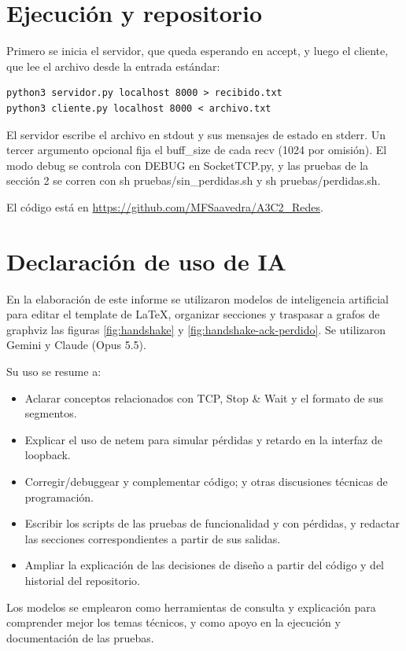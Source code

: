 \documentclass[
	spanish, %
	letterpaper, oneside
]{article}
\newcommand{\code}[1]{#1}     %
\newcommand{\field}[1]{#1}    %
\begin{document}
\section{Ejecución y repositorio}
Primero se inicia el servidor, que queda esperando en \code{accept}, y luego el cliente, que lee
el archivo desde la entrada estándar:

\begin{verbatim}
python3 servidor.py localhost 8000 > recibido.txt
python3 cliente.py localhost 8000 < archivo.txt
\end{verbatim}

El servidor escribe el archivo en stdout y sus mensajes de estado en stderr. Un tercer argumento
opcional fija el \field{buff\_size} de cada \code{recv} (1024 por omisión). El modo debug se
controla con \code{DEBUG} en \code{SocketTCP.py}, y las pruebas de la sección 2 se corren con
\code{sh pruebas/sin\_perdidas.sh} y \code{sh pruebas/perdidas.sh}.

El código está en \url{https://github.com/MFSaavedra/A3C2_Redes}.

\section{Declaración de uso de IA}
En la elaboración de este informe se utilizaron modelos de inteligencia artificial para editar el template de LaTeX, organizar secciones y traspasar a grafos de graphviz las figuras \ref{fig:handshake} y \ref{fig:handshake-ack-perdido}. Se utilizaron Gemini y Claude (Opus 5.5).

Su uso se resume a:
\begin{itemize}
	\item Aclarar conceptos relacionados con TCP, Stop \& Wait y el formato de sus segmentos.
	\item Explicar el uso de netem para simular pérdidas y retardo en la interfaz de loopback.
	\item Corregir/debuggear y complementar código; y otras discusiones técnicas de programación.
	\item Escribir los scripts de las pruebas de funcionalidad y con pérdidas, y redactar las secciones correspondientes a partir de sus salidas.
	\item Ampliar la explicación de las decisiones de diseño a partir del código y del historial del repositorio.
\end{itemize}

Los modelos se emplearon como herramientas de consulta y explicación para comprender mejor los temas técnicos, y como apoyo en la ejecución y documentación de las pruebas.

\end{document}
